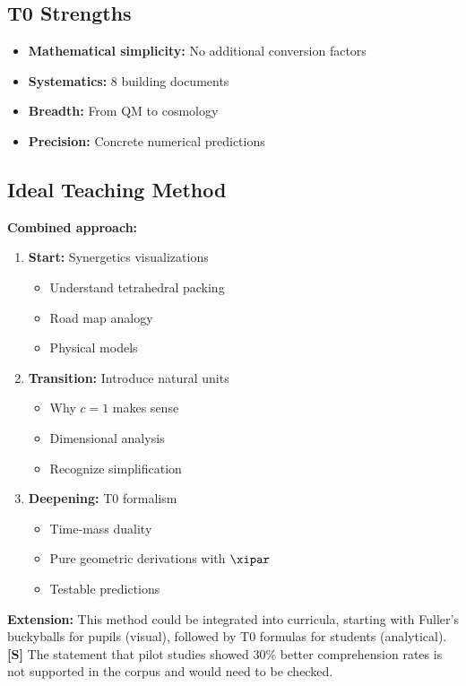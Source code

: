 	\subsection{T0 Strengths}
	
	\begin{itemize}
		\item \textbf{Mathematical simplicity:} No additional conversion factors
		\item \textbf{Systematics:} 8 building documents
		\item \textbf{Breadth:} From QM to cosmology
		\item \textbf{Precision:} Concrete numerical predictions
	\end{itemize}
	
	\subsection{Ideal Teaching Method}
	
	\begin{gemeinsam}
		\textbf{Combined approach:}
		
		\begin{enumerate}
			\item \textbf{Start:} Synergetics visualizations
			\begin{itemize}
				\item Understand tetrahedral packing
				\item Road map analogy
				\item Physical models
			\end{itemize}
			
			\item \textbf{Transition:} Introduce natural units
			\begin{itemize}
				\item Why $c = 1$ makes sense
				\item Dimensional analysis
				\item Recognize simplification
			\end{itemize}
			
			\item \textbf{Deepening:} T0 formalism
			\begin{itemize}
				\item Time-mass duality
				\item Pure geometric derivations with $\xipar$
				\item Testable predictions
			\end{itemize}
		\end{enumerate}
		
		\textbf{Extension:} This method could be integrated into curricula, starting with Fuller's buckyballs for pupils (visual), followed by T0 formulas for students (analytical). \textbf{[S]} The statement that pilot studies showed 30\% better comprehension rates is not supported in the corpus and would need to be checked.
	\end{gemeinsam}
	
